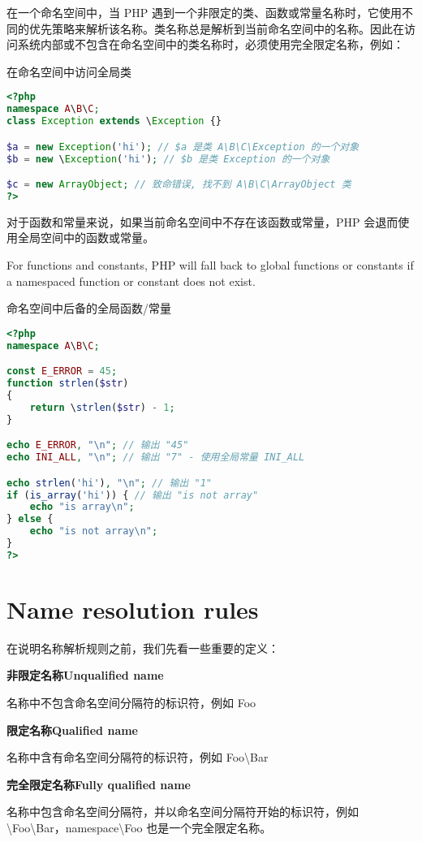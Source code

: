 在一个命名空间中，当 PHP 遇到一个非限定的类、函数或常量名称时，它使用不同的优先策略来解析该名称。类名称总是解析到当前命名空间中的名称。因此在访问系统内部或不包含在命名空间中的类名称时，必须使用完全限定名称，例如：


\begin{example}
在命名空间中访问全局类
\begin{lstlisting}[language=PHP]
<?php
namespace A\B\C;
class Exception extends \Exception {}

$a = new Exception('hi'); // $a 是类 A\B\C\Exception 的一个对象
$b = new \Exception('hi'); // $b 是类 Exception 的一个对象

$c = new ArrayObject; // 致命错误, 找不到 A\B\C\ArrayObject 类
?>
\end{lstlisting}
\end{example}

对于函数和常量来说，如果当前命名空间中不存在该函数或常量，PHP 会退而使用全局空间中的函数或常量。 

For functions and constants, PHP will fall back to global functions or constants if a namespaced function or constant does not exist.

\begin{example}
命名空间中后备的全局函数/常量
\begin{lstlisting}[language=PHP]
<?php
namespace A\B\C;

const E_ERROR = 45;
function strlen($str)
{
    return \strlen($str) - 1;
}

echo E_ERROR, "\n"; // 输出 "45"
echo INI_ALL, "\n"; // 输出 "7" - 使用全局常量 INI_ALL

echo strlen('hi'), "\n"; // 输出 "1"
if (is_array('hi')) { // 输出 "is not array"
    echo "is array\n";
} else {
    echo "is not array\n";
}
?>
\end{lstlisting}
\end{example}

\chapter{Name resolution rules}

在说明名称解析规则之前，我们先看一些重要的定义：

\begin{compactitem}
\item[] \textbf{非限定名称Unqualified name}

名称中不包含命名空间分隔符的标识符，例如 Foo

\item[] \textbf{限定名称Qualified name}

名称中含有命名空间分隔符的标识符，例如 Foo\textbackslash Bar

\item[] \textbf{完全限定名称Fully qualified name}

名称中包含命名空间分隔符，并以命名空间分隔符开始的标识符，例如 \textbackslash Foo\textbackslash Bar，namespace\textbackslash Foo 也是一个完全限定名称。

\end{compactitem}

